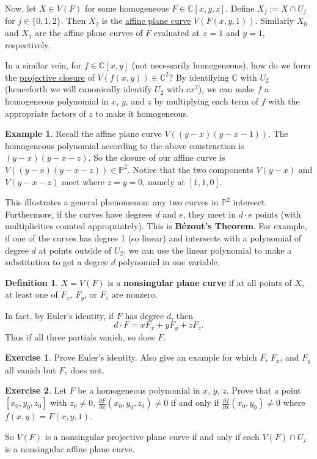 \documentclass[12pt]{article}
\newcommand{\cx}{\mathbb{C}}
\newcommand{\p}{\mathbb{P}}
\theoremstyle{definition}
\newtheorem{definition}[theorem]{Definition}
\newtheorem{example}[theorem]{Example}
\newtheorem{exercise}{Exercise}
\theoremstyle{remark}
\begin{document}
Now, let $X\in V(F)$ for some homogeneous $F\in\cx[x,y,z]$. Define $X_j:=X\cap U_j$ for $j\in\{0,1,2\}$. Then $X_2$ is the \underline{affine plane curve} $V(F(x,y,1))$. Similarly $X_0$ and $X_1$ are the affine plane curves of $F$ evaluated at $x=1$ and $y=1$, respectively. 

In a similar vein, for $f\in\cx[x,y]$ (not necessarily homogeneous), how do we form the \underline{projective closure} of $V(f(x,y))\in\cx^2$? By identifying $\cx$ with $U_2$ (henceforth we will canonically identify $U_2$ with $cx^2$), we can make $f$ a homogeneous polynomial in $x$, $y$, and $z$ by multiplying each term of $f$ with the appropriate factors of $z$ to make it homogeneous.
\begin{example}
    Recall the affine plane curve $V\left((y-x)(y-x-1)\right)$. The homogeneous polynomial according to the above construction is $(y-x)(y-x-z)$. So the closure of our affine curve is $V\left((y-x)(y-x-z)\right)\in\p^2$. Notice that the two components $V(y-x)$ and $V(y-x-z)$ meet where $z=y=0$, namely at $[1,1,0]$.
\end{example}
This illustrates a general phenomenon: any two curves in $\p^2$ intersect. Furthermore, if the curves have degrees $d$ and $e$, they meet in $d\cdot e$ points (with multiplicities counted appropriately). This is \textbf{B\'ezout's Theorem}. For example, if one of the curves has degree 1 (so linear) and intersects with a polynomial of degree $d$ at points outside of $U_2$, we can use the linear polynomial to make a substitution to get a degree $d$ polynomial in one variable.
\begin{definition}
    $X=V(F)$ is a \textbf{nonsingular plane curve} if at all points of $X$, at least one of $F_x$, $F_y$, or $F_z$ are nonzero.
\end{definition}
In fact, by Euler's identity, if $F$ has degree $d$, then 
\begin{equation}
    d\cdot F=xF_x+yF_y+zF_z.
\end{equation}
Thus if all three partials vanish, so does $F$. 
\begin{exercise}
    Prove Euler's identity. Also give an example for which $F$, $F_x$, and $F_y$ all vanish but $F_z$ does not.
\end{exercise}
\begin{exercise}
    Let $F$ be a homogeneous polynomial in $x$, $y$, $z$. Prove that a point $[x_0 , y_0 , z_0]$ with $z_0 \neq 0$, $\frac{\partial F}{\partial x} (x_0 , y_0 , z_0) \neq 0$ if and only if $\frac{\partial f}{\partial x} (x_0 , y_0) \neq 0$ where $f(x , y) = F(x, y, 1)$.
\end{exercise}
So $V(F)$ is a nonsingular projective plane curve if and only if each $V(F)\cap U_j$ is a nonsingular affine plane curve.
\end{document}

